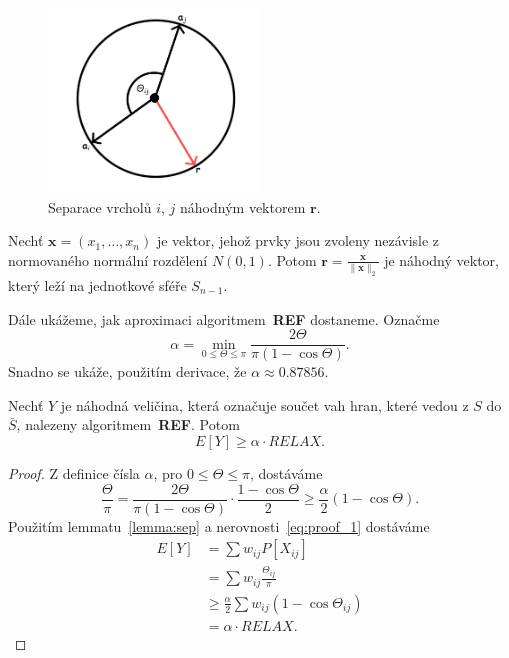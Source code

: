 \begin{figure}[h!]
    \centering
    \includegraphics[width=0.5\textwidth]{img/lemma_plane.png}   
    \caption{Separace vrcholů $i$, $j$ náhodným vektorem $\mathbf{r}$.}
    \label{fig:lemma_plane}
\end{figure}


\begin{lm}[KNUTH 2, 135]
    Nechť $\mathbf{x} = (x_1, \dots, x_n)$ je vektor, jehož prvky jsou zvoleny nezávisle z normovaného normální rozdělení $N(0,1)$. Potom $\mathbf{r} = \frac{\mathbf{x}}{\|\mathbf{x}\|_2}$ je náhodný vektor, který leží na jednotkové sféře $S_{n-1}$.
\end{lm}

Dále ukážeme, jak  aproximaci algoritmem~\textbf{REF} dostaneme. Označme
$$
    \alpha = \min_{0 \leq \Theta \leq \pi} \frac{2 \Theta}{\pi (1 - \cos \Theta)}.
$$
Snadno se ukáže, použitím derivace, že $\alpha \approx 0.87856$.

\begin{lm}
    Nechť $Y$ je náhodná veličina, která označuje součet vah hran, které vedou z $S$ do $\bar{S}$, nalezeny algoritmem~\textbf{REF}. Potom
    $$
        E\left[ Y \right] \geq \alpha \cdot RELAX.
    $$
\end{lm}

\begin{proof}
    Z definice čísla $\alpha$, pro $0 \leq \Theta \leq \pi$, dostáváme
    \begin{equation}
        \frac{\Theta}{\pi} = \frac{2 \Theta}{\pi (1 - \cos \Theta)} \cdot \frac{1 - \cos \Theta}{2} \geq \frac{\alpha}{2} (1 - \cos \Theta).
        \label{eq:proof_1}
    \end{equation}
    Použitím lemmatu~\ref{lemma:sep} a nerovnosti~\ref{eq:proof_1} dostáváme
    \begin{equation*}
        \begin{split}
            E\left[ Y \right] &= \sum w_{ij} P\left[ X_{ij} \right] \\
                              &= \sum w_{ij} \frac{\Theta_{ij}}{\pi} \\
                              &\geq \frac{\alpha}{2} \sum w_{ij} (1 - \cos \Theta_{ij}) \\
                              &= \alpha \cdot RELAX.
        \end{split}
    \end{equation*}
\end{proof}

